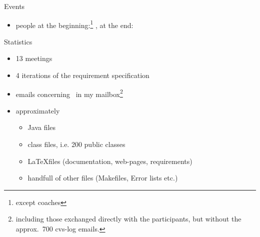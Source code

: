 \begin{myslide}{Events}
  \begin{itemize}
  \item people at the beginning:\footnote{except coaches} ,
    at the end: 
  \end{itemize}
\end{myslide}


\begin{myslide}{Statistics}
  \begin{itemize}
  \item 13 meetings
  \item 4 iterations of the requirement specification
  \item {} emails concerning \Slime\ in my
    mailbox\footnote{including those exchanged directly with the
      participants, but without the approx.\ 700 cvs-log emails.}
  \item approximately
    \begin{itemize}
    \item {} Java files
    \item {} class files, i.e. 200 public classes
    \item {}  \LaTeX files (documentation, web-pages, requirements)
    \item handfull of other files (Makefiles, Error lists etc.)
    \end{itemize}
  \end{itemize}
  
\end{myslide}






